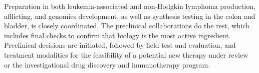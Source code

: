 \documentclass{article}
\begin{document}
Preparation in both leukemia-associated and non-Hodgkin lymphoma production, afflicting, and genomics development, as well as synthesis testing in the colon and bladder, is closely coordinated. The preclinical collaborations do the rest, which includes final checks to confirm that biology is the most active ingredient. Preclinical decisions are initiated, followed by field test and evaluation, and treatment modalities for the feasibility of a potential new therapy under review or the investigational drug discovery and immunotherapy program.
\end{document}
